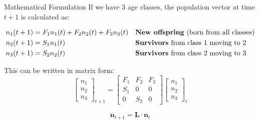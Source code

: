 \begin{frame}{Mathematical Formulation}
\footnotesize
If we have 3 age classes, the population vector at time $t+1$ is calculated as:

\begin{align*}
    n_1(t+1) &= F_1 n_1(t) + F_2 n_2(t) + F_3 n_3(t) && \text{\textbf{New offspring} (born from all classes)} \\
    n_2(t+1) &= S_1 n_1(t) && \text{\textbf{Survivors} from class 1 moving to 2} \\
    n_3(t+1) &= S_2 n_2(t) && \text{\textbf{Survivors} from class 2 moving to 3}
\end{align*}

\vspace{1em}
This can be written in matrix form:
\begin{equation*}
\begin{bmatrix} n_1 \\ n_2 \\ n_3 \end{bmatrix}_{t+1} = 
\begin{bmatrix}
F_1 & F_2 & F_3 \\
S_1 & 0 & 0 \\
0 & S_2 & 0
\end{bmatrix}
\begin{bmatrix} n_1 \\ n_2 \\ n_3 \end{bmatrix}_t
\end{equation*}

\begin{equation*}
    \mathbf{n}_{t+1} = \mathbf{L} \cdot \mathbf{n}_t
\end{equation*}

\end{frame}

